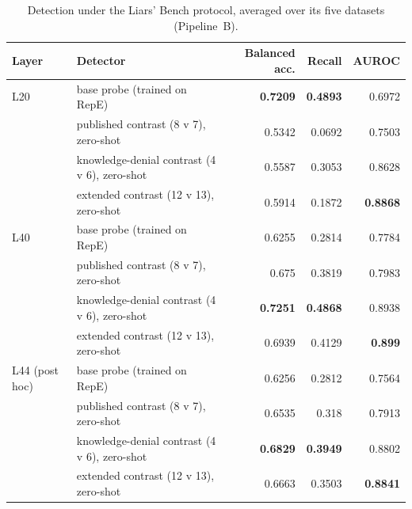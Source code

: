 \begin{table}[t]
\centering
\footnotesize
\caption{Detection under the Liars' Bench protocol, averaged over its five datasets (Pipeline~B).}
\label{tab:r-protocol}
\begin{tabular}{llrrr}
\hline
Layer & Detector & Balanced acc. & Recall & AUROC \\
\hline
L20 & base probe (trained on RepE) & \textbf{0.7209} & \textbf{0.4893} & 0.6972 \\
 & published contrast (8 v 7), zero-shot & 0.5342 & 0.0692 & 0.7503 \\
 & knowledge-denial contrast (4 v 6), zero-shot & 0.5587 & 0.3053 & 0.8628 \\
 & extended contrast (12 v 13), zero-shot & 0.5914 & 0.1872 & \textbf{0.8868} \\
\hline
L40 & base probe (trained on RepE) & 0.6255 & 0.2814 & 0.7784 \\
 & published contrast (8 v 7), zero-shot & 0.675 & 0.3819 & 0.7983 \\
 & knowledge-denial contrast (4 v 6), zero-shot & \textbf{0.7251} & \textbf{0.4868} & 0.8938 \\
 & extended contrast (12 v 13), zero-shot & 0.6939 & 0.4129 & \textbf{0.899} \\
\hline
L44 (post hoc) & base probe (trained on RepE) & 0.6256 & 0.2812 & 0.7564 \\
 & published contrast (8 v 7), zero-shot & 0.6535 & 0.318 & 0.7913 \\
 & knowledge-denial contrast (4 v 6), zero-shot & \textbf{0.6829} & \textbf{0.3949} & 0.8802 \\
 & extended contrast (12 v 13), zero-shot & 0.6663 & 0.3503 & \textbf{0.8841} \\
\hline
\end{tabular}
\end{table}

